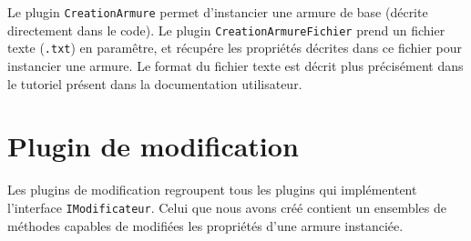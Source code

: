 Le plugin \texttt{CreationArmure} permet d'instancier une armure de base (décrite directement dans le code). Le plugin \texttt{CreationArmureFichier} prend un fichier texte (\texttt{.txt}) en paramêtre, et récupére les propriétés décrites dans ce fichier pour instancier une armure. Le format du fichier texte est décrit plus précisément dans le tutoriel présent dans la documentation utilisateur.


\section{Plugin de modification}

Les plugins de modification regroupent tous les plugins qui implémentent l'interface \texttt{IModificateur}. Celui que nous avons créé contient un ensembles de méthodes capables de modifiées les propriétés d'une armure instanciée.

